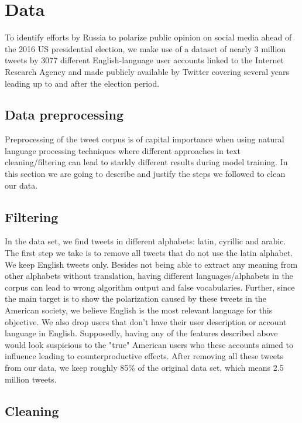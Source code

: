 \documentclass[12pt, authoryear]{elsarticle}
\begin{document}
\section{Data}\label{data}
To identify efforts by Russia to polarize public opinion on social media ahead of the 2016 US presidential election, we make use of a dataset of nearly 3 million tweets by 3077 different English-language user accounts linked to the Internet Research Agency and made publicly available by Twitter covering several years leading up to and after the election period.

\subsection{Data preprocessing}
    
Preprocessing of the tweet corpus is of capital importance when using natural language processing techniques where different approaches in text cleaning/filtering can lead to starkly different results during model training. In this section we are going to describe and justify the steps we followed to clean our data.
    
\subsection{Filtering}

In the data set, we find tweets in different alphabets: latin, cyrillic and arabic. The first step we take is to remove all tweets that do not use the latin alphabet. We keep English tweets only. Besides not being able to extract any meaning from other alphabets without translation, having different languages/alphabets in the corpus can lead to wrong algorithm output and false vocabularies. Further, since the main target is to show the polarization caused by these tweets in the American society, we believe English is the most relevant language for this objective. We also drop users that don't have their user description or account language in English. Supposedly, having any of the features described above would look suspicious to the "true" American users who these accounts aimed to influence leading to counterproductive effects. After removing all these tweets from our data, we keep roughly 85\% of the original data set, which means 2.5 million tweets.

\subsection{Cleaning}
\end{document}
